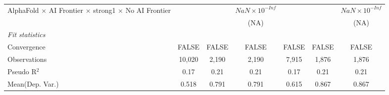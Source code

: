 \begin{tabular}{lcccccc}
   AlphaFold $\times$ AI Frontier $\times$ strong1 $\times$ No AI Frontier    &                        &                        & $NaN\times 10^{-Inf}$  &                        &                        & $NaN\times 10^{-Inf}$\\    
                                                                              &                        &                        & (NA)                   &                        &                        & (NA)\\   
   \midrule
   \emph{Fit statistics}\\
   Convergence                                                                &FALSE                   & FALSE                  & FALSE                  & FALSE                  & FALSE                  & FALSE\\  
   Observations                                                               & 10,020                 & 2,190                  & 2,190                  & 7,915                  & 1,876                  & 1,876\\  
   Pseudo R$^2$                                                               & 0.17                   & 0.21                   & 0.21                   & 0.17                   & 0.21                   & 0.21\\  
Mean(Dep. Var.) & 0.518 & 0.791 & 0.791 & 0.615 & 0.867 & 0.867 \\
   

\end{tabular}
